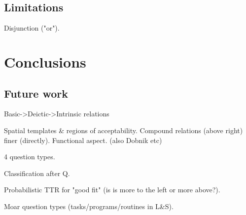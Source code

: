 \documentclass[11pt, a4paper]{article}
\begin{document}
\subsection{Limitations}

Disjunction ("or").



\section{Conclusions}
\label{sec:conclusions}



\subsection{Future work}

Basic->Deictic->Intrinsic relations  \cite{LoganComputationalAnalysisApprehension1996}

Spatial templates \& regions of acceptability. Compound relations (above right) finer (directly). Functional aspect.  \cite{LoganComputationalAnalysisApprehension1996} (also Dobnik etc)

4 question types.

Classification after Q.

Probabilistic TTR for "good fit" (is is more to the left or more above?).

Moar question types (tasks/programs/routines in L\&S).




\end{document}
